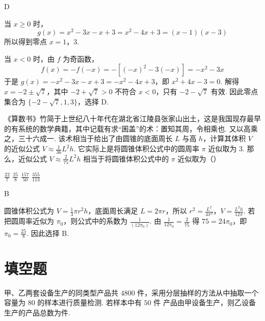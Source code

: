 \begin{answer}
D
\end{answer}

\begin{solution}
当 \(x\geqslant0\) 时，
\[
g(x)=x^2-3x-x+3=x^2-4x+3=(x-1)(x-3)
\]
所以得到零点 \(x=1\)，\(3\).

当 \(x<0\) 时，由 \(f\) 为奇函数，
\[
f(x)=-f(-x)=-\left[(-x)^2-3(-x)\right]=-x^2-3x
\]
于是 \(g(x)=-x^2-3x-x+3=-x^2-4x+3\)，即 \(x^2+4x-3=0\). 解得 \(x=-2\pm\sqrt7\)，其中 \(-2+\sqrt7>0\) 不符合 \(x<0\)，只有 \(-2-\sqrt7\) 有效.
因此零点集合为 \(\{-2-\sqrt7,1,3\}\)，选择 D.
\end{solution}

\begin{problem}
《算数书》竹简于上世纪八十年代在湖北省江陵县张家山出土，这是我国现存最早的有系统的数学典籍，其中记载有求“囷盖”的术：置知其周，令相乘也. 又以高乘之，三十六成一. 该术相当于给出了由圆锥的底面周长 \(L\) 与高 \(h\)，计算其体积 \(V\) 的近似公式 \(V \approx \frac{1}{36}L^2h\). 它实际上是将圆锥体积公式中的圆周率 \(\pi\) 近似取为 \(3\). 那么，近似公式 \(V \approx \frac{2}{75}L^2h\) 相当于将圆锥体积公式中的 \(\pi\) 近似取为（\quad）

\choices
    {\(\frac{22}{7}\)}
    {\(\frac{25}{8}\)}
    {\(\frac{157}{50}\)}
    {\(\frac{355}{113}\)}
\end{problem}

\begin{answer}
B
\end{answer}

\begin{solution}
圆锥体积公式为 \(V=\frac13\pi r^2h\)，底面周长满足 \(L=2\pi r\)，所以 \(r^2=\frac{L^2}{4\pi^2}\)，\(V=\frac{L^2h}{12\pi}\).
若把圆周率近似为 \(\pi_0\)，则公式中的系数为 \(\frac{1}{(12\pi_0)}\). 由 \(\frac{1}{12\pi_0}=\frac{2}{75}\) 得 \(75=24\pi_0\)，即 \(\pi_0=\frac{25}{8}\). 因此选择 B.
\end{solution}

\section{填空题}

\begin{problem}
甲、乙两套设备生产的同类型产品共 \(4800\text{ 件}\)，采用分层抽样的方法从中抽取一个容量为 \(80\) 的样本进行质量检测. 若样本中有 \(50\text{ 件}\) 产品由甲设备生产，则乙设备生产的产品总数为\fillinblank{}\(\text{件}\).
\end{problem}

